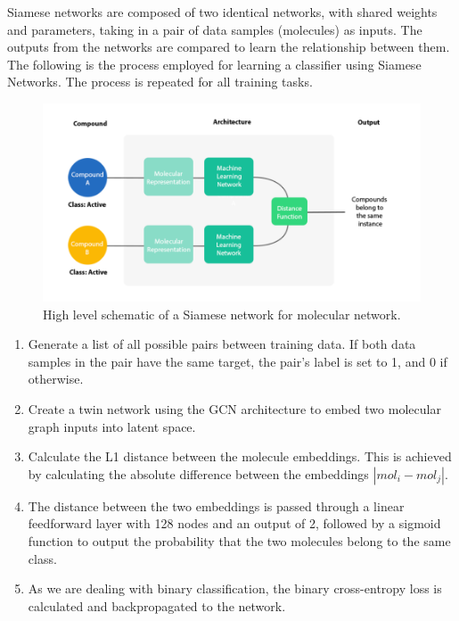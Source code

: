 Siamese networks \citep{koch2015siamese} are composed of two identical networks, with shared weights and parameters, taking in a pair of data samples (molecules) as inputs. The outputs from the networks are compared to learn the relationship between them. The following is the process employed for learning a classifier using Siamese Networks. The process is repeated for all training tasks.

\begin{figure}[h]
	\centering
	\includegraphics[width=0.9\linewidth]{img/high-level siamese.png}
	\caption[High-level schematic of Siamese network]{High level schematic of a Siamese network for molecular network. }
	\label{fig:siamesenetarchi}
\end{figure}

\begin{enumerate}
    \item Generate a list of all possible pairs between training data. If both data samples in the pair have the same target, the pair's label is set to 1, and 0 if otherwise.
    \item Create a twin network using the GCN architecture to embed two molecular graph inputs into latent space.
    \item Calculate the L1 distance between the molecule embeddings. This is achieved by calculating the absolute difference between the embeddings $|mol_i-mol_j|$.
    \item The distance between the two embeddings is passed through a linear feedforward layer with 128 nodes and an output of 2, followed by a sigmoid function to output the probability that the two molecules belong to the same class.
    \item As we are dealing with binary classification, the binary cross-entropy loss is calculated and backpropagated to the network.
\end{enumerate}

